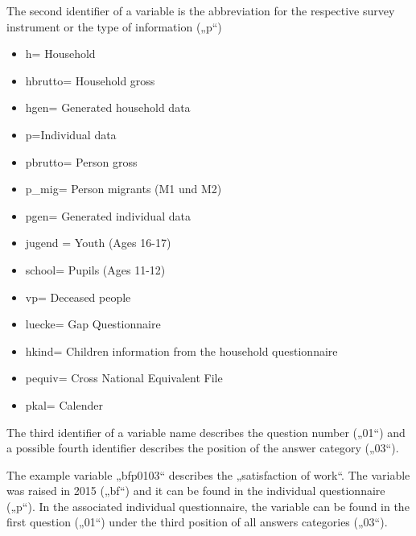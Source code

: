 \documentclass[letterpaper,10pt,openany,onesideH,english]{sphinxmanual}
\begin{document}
The second identifier of a variable is the abbreviation for the respective survey instrument or the type of information („p“)
\begin{itemize}
\item {} 
h= Household

\item {} 
hbrutto= Household gross

\item {} 
hgen= Generated household data

\item {} 
p=Individual data

\item {} 
pbrutto= Person gross

\item {} 
p\_mig= Person migrants (M1 und M2)

\item {} 
pgen= Generated individual data

\item {} 
jugend = Youth (Ages 16-17)

\item {} 
school= Pupils (Ages 11-12)

\item {} 
vp= Deceased people

\item {} 
luecke= Gap Questionnaire

\item {} 
hkind= Children information from the household questionnaire

\item {} 
pequiv= Cross National Equivalent File

\item {} 
pkal= Calender

\end{itemize}

The third identifier of a variable name describes the question number („01“) and a possible fourth identifier describes the position of the answer category („03“).

\begin{figure}[H]
\centering

\noindent{}
\end{figure}

The example variable „bfp0103“ describes the „satisfaction of work“. The variable was raised in 2015 („bf“) and it can be found in the individual questionnaire („p“).  In the associated individual questionnaire, the variable can be found in the first question („01“) under the third position of all answers categories („03“).
\end{document}
